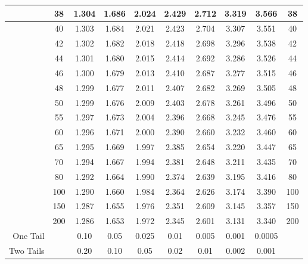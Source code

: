 \begin{table}[h]
\begin{center}
\begin{tabular}{|r|c|c|c|c|c|c|c|c|c|}
\hline    &38 &   1.304 &  1.686 &  2.024 &  2.429 &  2.712 &  3.319 &  3.566 &  38 \\
\hline    &40 &   1.303 &  1.684 &  2.021 &  2.423 &  2.704 &  3.307 &  3.551 &  40  \\
\hline    &42 &   1.302 &  1.682 &  2.018 &  2.418 &  2.698 &  3.296 &  3.538 &  42  \\
\hline    &44 &   1.301 &  1.680 &  2.015 &  2.414 &  2.692 &  3.286 &  3.526 &  44  \\
\hline    &46 &   1.300 &  1.679 &  2.013 &  2.410 &  2.687 &  3.277 &  3.515 &  46  \\
\hline    &48 &   1.299 &  1.677 &  2.011 &  2.407 &  2.682 &  3.269 &  3.505 &  48  \\
\hline    &50 &   1.299 &  1.676 &  2.009 &  2.403 &  2.678 &  3.261 &  3.496 &  50 \\
\hline    &55 &   1.297 &  1.673 &  2.004 &  2.396 &  2.668 &  3.245 &  3.476 &  55  \\
\hline    &60 &   1.296 &  1.671 &  2.000 &  2.390 &  2.660 &  3.232 &  3.460 &  60  \\
\hline    &65 &   1.295 &  1.669 &  1.997 &  2.385 &  2.654 &  3.220 &  3.447 &  65  \\
\hline    &70 &   1.294 &  1.667 &  1.994 &  2.381 &  2.648 &  3.211 &  3.435 &  70  \\
\hline    &80 &   1.292 &  1.664 &  1.990 &  2.374 &  2.639 &  3.195 &  3.416 &  80  \\
\hline   &100 &   1.290 &  1.660 &  1.984 &  2.364 &  2.626 &  3.174 &  3.390 & 100  \\  
\hline   &150 &   1.287 &  1.655 &  1.976 &  2.351 &  2.609 &  3.145 &  3.357 & 150  \\
\hline   &200 &   1.286 &  1.653 &  1.972 &  2.345 &  2.601 &  3.131 &  3.340 & 200 \\
\hline One Tail& & 0.10 & 0.05 & 0.025 & 0.01 & 0.005 & 0.001 & 0.0005 &\\ 
\hline Two Tails& & 0.20 &   0.10 &   0.05 &   0.02  &  0.01  &  0.002 & 0.001 & \\ 
\hline 
\end{tabular} 
\end{center}
\end{table}
\vspace{-2 in}
%